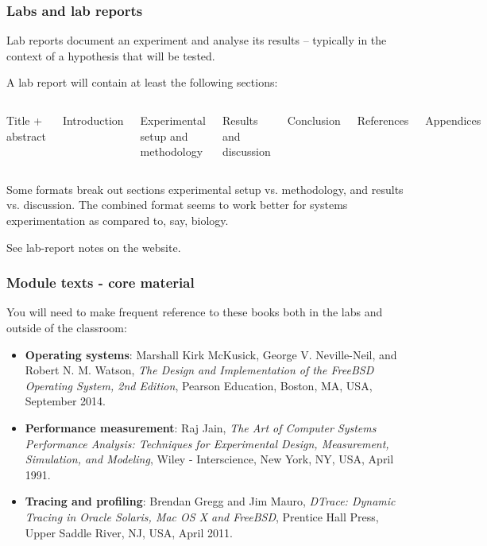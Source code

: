 \begin{frame}
  \frametitle{Labs and lab reports}

  Lab reports document an experiment and analyse its results -- typically in
  the context of a hypothesis that will be tested.
  \medskip

  A lab report will contain at least the following sections:

  \begin{enumerate}
    \begin{columns}[T]
      \item Title + abstract
      \item Introduction
      \item Experimental setup and methodology
      \item Results and discussion
      \item Conclusion
      \item References
      \item Appendices
    \end{columns}
  \end{enumerate}

  Some formats break out sections experimental setup vs.  methodology, and
  results vs. discussion.  The combined format seems to work better for
  systems experimentation as compared to, say, biology.
  \medskip

  See lab-report notes on the website.
\end{frame}

\begin{frame}
  \frametitle{Module texts - core material}

  You will need to make frequent reference to these books both in the labs and
  outside of the classroom:

  \begin{itemize}
    \item {\bf Operating systems}: Marshall Kirk McKusick, George V.
      Neville-Neil, and Robert N. M. Watson, \textit{The Design and
      Implementation of the FreeBSD Operating System, 2nd Edition}, Pearson
      Education, Boston, MA, USA, September 2014.

    \pause
    \bigskip
    \item {\bf Performance measurement}: Raj Jain, \textit{The Art of Computer
      Systems Performance Analysis: Techniques for Experimental Design,
      Measurement, Simulation, and Modeling}, Wiley - Interscience, New York,
      NY, USA, April 1991.

    \pause
    \bigskip
    \item {\bf Tracing and profiling}: Brendan Gregg and Jim Mauro,
      \textit{DTrace: Dynamic Tracing in Oracle Solaris, Mac OS X and
      FreeBSD}, Prentice Hall Press, Upper Saddle River, NJ, USA, April 2011.
  \end{itemize}
\end{frame}

